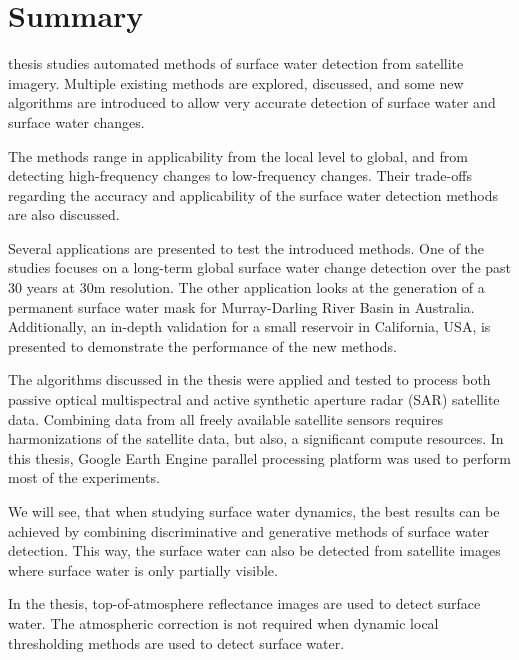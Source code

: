 \chapter*{Summary}

 thesis studies automated methods of surface water detection from satellite imagery. Multiple existing methods are explored, discussed, and some new algorithms are introduced to allow very accurate detection of surface water and surface water changes. 

The methods range in applicability from the local level to global, and from detecting high-frequency changes to low-frequency changes. Their trade-offs regarding the accuracy and applicability of the surface water detection methods are also discussed.

Several applications are presented to test the introduced methods. One of the studies focuses on a long-term global surface water change detection over the past 30 years at 30m resolution. The other application looks at the generation of a permanent surface water mask for Murray-Darling River Basin in Australia. Additionally, an in-depth validation for a small reservoir in California, USA, is presented to demonstrate the performance of the new methods. 

The algorithms discussed in the thesis were applied and tested to process both passive optical multispectral and active synthetic aperture radar (SAR) satellite data. Combining data from all freely available satellite sensors requires harmonizations of the satellite data, but also, a significant compute resources. In this thesis, Google Earth Engine parallel processing platform was used to perform most of the experiments.

We will see, that when studying surface water dynamics, the best results can be achieved by combining discriminative and generative methods of surface water detection. This way, the surface water can also be detected from satellite images where surface water is only partially visible. 

In the thesis, top-of-atmosphere reflectance images are used to detect surface water. The atmospheric correction is not required when dynamic local thresholding methods are used to detect surface water.

